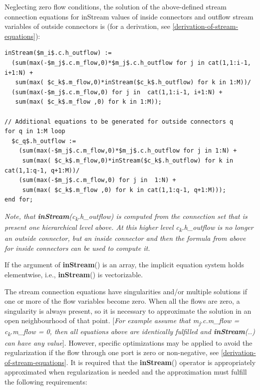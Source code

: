 \documentclass[10pt,a4paper]{report}
\begin{document}
Neglecting zero flow conditions, the solution of the above-defined
stream connection equations for inStream values of inside connectors and
outflow stream variables of outside connectors is (for a derivation, see
\ref{derivation-of-stream-equations}):

\begin{lstlisting}[language=modelica,mathescape=true]
inStream($m_i$.c.h_outflow) :=
  (sum(max(-$m_j$.c.m_flow,0)*$m_j$.c.h_outflow for j in cat(1,1:i-1, i+1:N) +
   sum(max( $c_k$.m_flow,0)*inStream($c_k$.h_outflow) for k in 1:M))/
  (sum(max(-$m_j$.c.m_flow,0) for j in  cat(1,1:i-1, i+1:N) +
   sum(max( $c_k$.m_flow ,0) for k in 1:M));
  
// Additional equations to be generated for outside connectors q
for q in 1:M loop
  $c_q$.h_outflow :=
    (sum(max(-$m_j$.c.m_flow,0)*$m_j$.c.h_outflow for j in 1:N) +
     sum(max( $c_k$.m_flow,0)*inStream($c_k$.h_outflow) for k in cat(1,1:q-1, q+1:M))/
    (sum(max(-$m_j$.c.m_flow,0) for j in  1:N) +
     sum(max( $c_k$.m_flow ,0) for k in cat(1,1:q-1, q+1:M)));
end for;
\end{lstlisting}

\emph{Note, that \textbf{inStream}(c\textsubscript{k}.h\_outflow) is
computed from the connection set that is present one hierarchical level
above. At this higher level c\textsubscript{k}.h\_outflow is no longer
an outside connector, but an inside connector and then the formula from
above for inside connectors can be used to compute it.}

If the argument of \textbf{inStream}() is an array, the implicit
equation system holds elementwise, i.e., \textbf{inStream}() is
vectorizable.

The stream connection equations have singularities and/or multiple
solutions if one or more of the flow variables become zero. When all the
flows are zero, a singularity is always present, so it is necessary to
approximate the solution in an open neighbourhood of that point.
{[}\emph{For example assume that m\textsubscript{j}.c.m\_flow =
c\textsubscript{k}.m\_flow = 0, then all equations above are identically
fulfilled and \textbf{inStream}(..) can have any value}{]}. However,
specific optimizations may be applied to avoid the regularization if the
flow through one port is zero or non-negative, see \ref{derivation-of-stream-equations}. It is
required that the \textbf{inStream}() operator is appropriately
approximated when regularization is needed and the approximation must
fulfill the following requirements:
\end{document}
